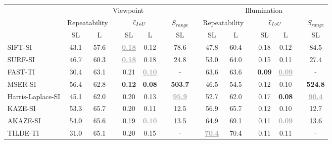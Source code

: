 \begin{landscape}
\begin{table}[!tbh]
\vspace{-0.10cm}
\begin{center}
\begin{tabular}{lccccccclccccccc}
\hline
\noalign{\smallskip}
\multicolumn{1}{c}{} & \multicolumn{7}{c}{Viewpoint} & \multicolumn{1}{c}{} & \multicolumn{7}{c}{Illumination} \\ 
\cline{2-8} \cline{10-16} \noalign{\smallskip}
\multicolumn{1}{c}{} & \multicolumn{2}{c}{Repeatability} && \multicolumn{2}{c}{$\Bar{\epsilon}_{IoU}$} && \multicolumn{1}{c}{$S_{range}$} & \multicolumn{1}{c}{} & \multicolumn{2}{c}{Repeatability} && \multicolumn{2}{c}{$\Bar{\epsilon}_{IoU}$} && \multicolumn{1}{c}{$S_{range}$} \\
\cline{2-3} \cline{5-6} \cline{8-8} \cline{10-11}  \cline{13-14} \cline{16-16} \noalign{\smallskip}
 & SL & L && SL & L && SL && SL & L && SL & L && SL \\
\noalign{\smallskip}
\hline
\noalign{\smallskip}
SIFT-SI \cite{SIFT}                    & 43.1 & 57.6 && \textbf{\textcolor{darkgray}{\underline{0.18}}} & 0.12 && 78.6 && 47.8 & 60.4 && 0.18 & 0.12 && 84.5 \\
SURF-SI \cite{SURF}                    & 46.7 & 60.3 && \textbf{\textcolor{darkgray}{\underline{0.18}}} & 0.18 && 24.8 && 53.0 & 64.0 && 0.15 & 0.11 && 27.4 \\
FAST-TI \cite{FAST}                    & 30.4 & 63.1 && 0.21 & \textbf{\textcolor{darkgray}{\underline{0.10}}} && - && 63.6 & 63.6 && \textbf{0.09} & \textbf{\textcolor{darkgray}{\underline{0.09}}} && - \\
MSER-SI \cite{MSER}                    & 56.4 & 62.8 && \textbf{0.12} & \textbf{0.08} && \textbf{503.7} && 46.5 & 54.5 && 0.12 & 0.10 && \textbf{524.8} \\
Harris-Laplace-SI \cite{HarrisLaplace} & 45.1 & 62.0 && 0.20 & 0.13 && \textbf{\textcolor{darkgray}{\underline{95.9}}} && 52.7 & 62.0 && 0.17 & \textbf{0.08} && \textbf{\textcolor{darkgray}{\underline{90.4}}} \\
KAZE-SI \cite{KAZE}                    & 53.3 & 65.7 && 0.20 & 0.11 && 12.5 && 56.9 & 65.7 && 0.12 & 0.10 && 12.7 \\
AKAZE-SI \cite{AKAZE}                  & 54.0 & 65.6 && 0.19 & \textbf{\textcolor{darkgray}{\underline{0.10}}} && 13.5 && 64.9 & 69.1 && 0.11 & \textbf{\textcolor{darkgray}{\underline{0.09}}} && 13.6 \\
TILDE-TI \cite{TILDE}                  & 31.0 & 65.1 && 0.20 & 0.15 && - && \textbf{\textcolor{darkgray}{\underline{70.4}}} & 70.4 && 0.11 & 0.11 && - \\

\end{tabular}
\end{center}
\end{table}
\end{landscape}
